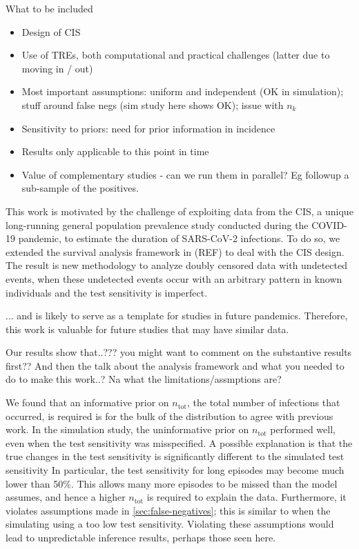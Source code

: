 \documentclass[12pt]{article}
\newcommand{\ntot}{n_\text{tot}}
\begin{document}
What to be included
\begin{itemize}
    \item Design of CIS
    \item Use of TREs, both computational and practical challenges (latter due to moving in / out)
    \item Most important assumptions: uniform and independent (OK in simulation); stuff around false negs (sim study here shows OK); issue with $n_k$
    \item Sensitivity to priors: need for prior information in incidence
    \item Results only applicable to this point in time
    \item Value of complementary studies - can we run them in parallel? Eg followup a sub-sample of the positives.
\end{itemize}

This work is motivated by the challenge of exploiting data from the CIS, a unique long-running general population prevalence study conducted during the COVID-19 pandemic, to estimate the duration of SARS-CoV-2 infections. To do so, we extended the survival analysis framework in (REF) to deal with the CIS design. The result is new methodology to analyze doubly censored data with undetected events, when these undetected events occur with an arbitrary pattern in known individuals and the test sensitivity is imperfect.

... and is likely to serve as a template for studies in future pandemics.
Therefore, this work is valuable for future studies that may have similar data.

Our results show that..??? you might want to comment on the substantive results first?? And then the talk about the analysis framework and what you needed to do to make this work..? Na what the limitations/assmptions are?

We found that an informative prior on $\ntot$, the total number of infections that occurred, is required is for the bulk of the distribution to agree with previous work.
In the simulation study, the uninformative prior on $\ntot$ performed well, even when the test sensitivity was misspecified.
A possible explanation is that the true changes in the test sensitivity is significantly different to the simulated test sensitivity
In particular, the test sensitivity for long episodes may become much lower than 50\%.
This allows many more episodes to be missed than the model assumes, and hence a higher $\ntot$ is required to explain the data.
Furthermore, it violates assumptions made in \cref{sec:false-negatives}; this is similar to when the simulating using a too low test sensitivity.
Violating these assumptions would lead to unpredictable inference results, perhaps those seen here.
\end{document}
